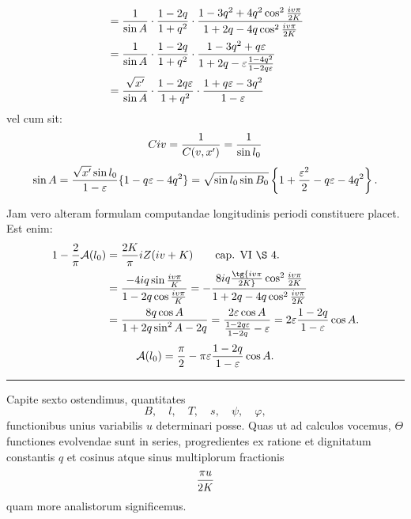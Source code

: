 \begingroup\small
\[
\begin{aligned}
&={1\over\sin A}\cdot{1-2q\over1+q^2}\cdot
 {1-3q^2+4q^2\cos^2{iv\pi\over2K}
  \over 1+2q-4q\cos^2{iv\pi\over2K}}\\
&={1\over\sin A}\cdot{1-2q\over1+q^2}\cdot
 {1-3q^2+q\varepsilon\over 1+2q-\varepsilon{1-4q^2\over1-2q\varepsilon}}\\
&={\sqrt{x'}\over\sin A}\cdot{1-2q\varepsilon\over1+q^2}\cdot {1+q\varepsilon-3q^2\over1-\varepsilon}
\end{aligned}
\]
vel cum sit:
\[
 Civ={1\over C(v,x')}={1\over \sin l_0}
\]
\[
 \sin A={\sqrt{x'}\sin l_0\over1-\varepsilon}\{1-q\varepsilon-4q^2\}
 =\sqrt{\sin l_0\sin B_0}\left\{1+{\varepsilon^2\over2}-q\varepsilon-4q^2\right\}.
\]


Jam vero alteram formulam computandae longitudinis periodi constituere placet.
Est enim:
\[
\begin{aligned}
1-{2\over\pi}\mathcal A(l_0)&={2K\over\pi}iZ(iv+K)\qquad \text{cap. VI \S\ 4.}\\
&={-4iq\sin {iv\pi\over K}\over 1-2q\cos {iv\pi\over K}}
=-{8iq\tg {iv\pi\over2K}\cos^2{iv\pi\over2K}
\over 1+2q-4q\cos^2{iv\pi\over2K}}\\
&={8q\cos A\over1+2q\sin^2A-2q}
={2\varepsilon\cos A\over {1-2q\varepsilon\over1-2q}-\varepsilon}
=2\varepsilon{1-2q\over1-\varepsilon}\cos A.
\end{aligned}
\]
\[
 \mathcal A(l_0)={\pi\over2}-\pi\varepsilon{1-2q\over1-\varepsilon}\cos A.
\]

\rule{0.35\textwidth}{0.4pt}


Capite sexto ostendimus, quantitates
\[
 B,\quad l,\quad T,\quad s,\quad \psi,\quad \varphi,
\]
functionibus unius variabilis $u$ determinari posse. Quas ut ad calculos vocemus, $\Theta$ functiones evolvendae sunt in series, progredientes ex ratione et dignitatum constantis $q$ et cosinus atque sinus multiplorum fractionis
\[
 {\pi u\over2K}
\]
quam more analistorum  significemus.

\endgroup
